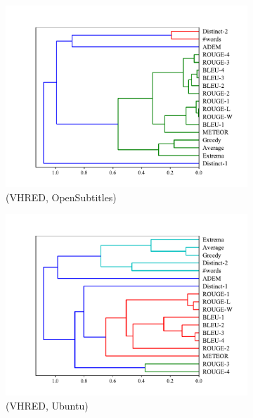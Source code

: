 \begin{figure}[htb]
\begin{subfigure}{0.33\linewidth}
        \includegraphics[width=\linewidth]{figure/plot/hierarchy/v2/pearson/vhred/opensub/plot.pdf}
        \caption{(VHRED, OpenSubtitles)}
    \end{subfigure}%
    \begin{subfigure}{0.33\linewidth}
        \centering
        \includegraphics[width=\linewidth]{figure/plot/hierarchy/v2/pearson/vhred/ubuntu/plot.pdf}
        \caption{(VHRED, Ubuntu)}
    \end{subfigure}
    \begin{subfigure}{0.33\linewidth}
        \centering

\end{subfigure}
\end{figure}
